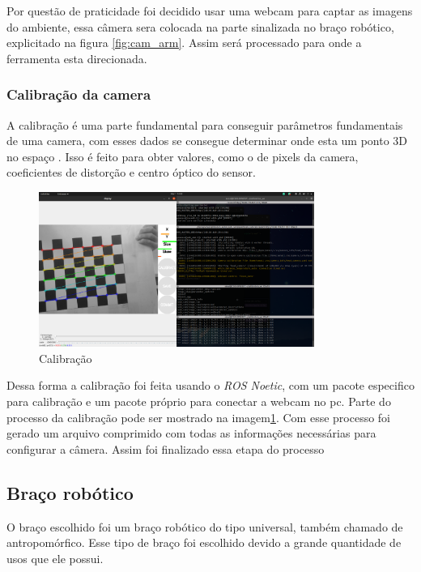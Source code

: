 \documentclass[conference]{IEEEtran}
\begin{document}
Por questão de praticidade foi decidido usar uma webcam para captar as imagens do ambiente, essa câmera sera colocada na parte sinalizada no braço robótico, explicitado na figura \ref{fig:cam_arm}. Assim será processado para onde a ferramenta esta direcionada.

\subsubsection{Calibração da camera}

A calibração é uma parte fundamental para conseguir parâmetros fundamentais de uma camera, com esses dados se consegue determinar onde esta um ponto 3D no espaço \cite{ArUco}. Isso é feito para obter valores, como o de pixels da camera, coeficientes de distorção e centro óptico do sensor\cite{ArUco}.

\begin{figure}[h!]
    \centering
        \includegraphics[width=9cm]{images/calibration.png}
    \caption{Calibração}
    \label{fig:calibration}
\end{figure}

Dessa forma a calibração foi feita usando o \textit{ROS Noetic}, com um pacote especifico para calibração\cite{camera_calibration:online} e um pacote próprio para conectar a webcam no pc\cite{usbcamRO60:online}. Parte do processo da calibração pode ser mostrado na imagem\ref{fig:calibration}. Com esse processo foi gerado um arquivo comprimido com todas as informações necessárias para configurar a câmera. Assim foi finalizado essa etapa do processo

\subsection{Braço robótico}

O braço escolhido foi um braço robótico do tipo universal\cite{robotica1}, também chamado de antropomórfico. Esse tipo de braço foi escolhido devido a grande quantidade de usos que ele possui\cite{robotica1}.
\end{document}
